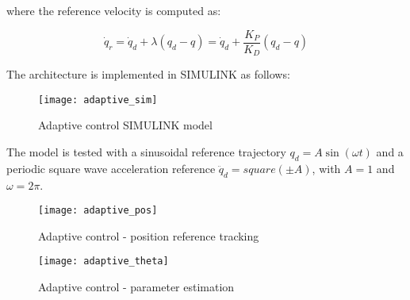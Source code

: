 where the reference velocity is computed as:

\begin{equation*}
\dot q_r = \dot q_d+\lambda (q_d-q) = \dot q_d+\frac{K_P}{K_D} (q_d-q)
\end{equation*}

The architecture is implemented in SIMULINK as follows:

\begin{figure}[H]
\centering
\texttt{[image: adaptive\_sim]}
\caption{Adaptive control SIMULINK model}
\end{figure}

The model is tested with a sinusoidal reference trajectory $q_d=A\sin(\omega t)$ and a periodic square wave acceleration reference $\ddot q_d = square(\pm A)$, with $A=1$ and $\omega = 2\pi$.

\newpage

\begin{figure}[H]
\centering
\texttt{[image: adaptive\_pos]}
\caption{Adaptive control - position reference tracking}
\end{figure}

\begin{figure}[H]
\centering
\texttt{[image: adaptive\_theta]}
\caption{Adaptive control - parameter estimation}
\end{figure}
